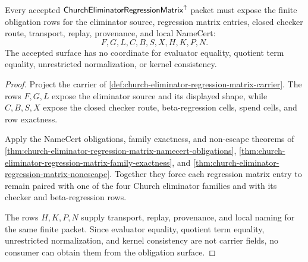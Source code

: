 \begin{theorem}
\label{thm:church-eliminator-regression-matrix-obligation-surface}
Every accepted $\mathsf{ChurchEliminatorRegressionMatrix}^{\uparrow}$ packet must expose the finite obligation rows for the eliminator source, regression matrix entries, closed checker route, transport, replay, provenance, and local NameCert:
$$
F,G,L,C,B,S,X,H,K,P,N.
$$
The accepted surface has no coordinate for evaluator equality, quotient term equality, unrestricted normalization, or kernel consistency.
\end{theorem}
\begin{proof}
Project the carrier of \autoref{def:church-eliminator-regression-matrix-carrier}. The rows $F,G,L$ expose the eliminator source and its displayed shape, while $C,B,S,X$ expose the closed checker route, beta-regression cells, spend cells, and row exactness.

Apply the NameCert obligations, family exactness, and non-escape theorems of \autoref{thm:church-eliminator-regression-matrix-namecert-obligations}, \autoref{thm:church-eliminator-regression-matrix-family-exactness}, and \autoref{thm:church-eliminator-regression-matrix-nonescape}. Together they force each regression matrix entry to remain paired with one of the four Church eliminator families and with its checker and beta-regression rows.

The rows $H,K,P,N$ supply transport, replay, provenance, and local naming for the same finite packet. Since evaluator equality, quotient term equality, unrestricted normalization, and kernel consistency are not carrier fields, no consumer can obtain them from the obligation surface.
\end{proof}


\begin{closurestatus}{\ChurchEliminatorRegressionMatrixUp}
  \theoryclosure{\seedClosure}
  \formalstatus{\unformalizedV}
\end{closurestatus}
